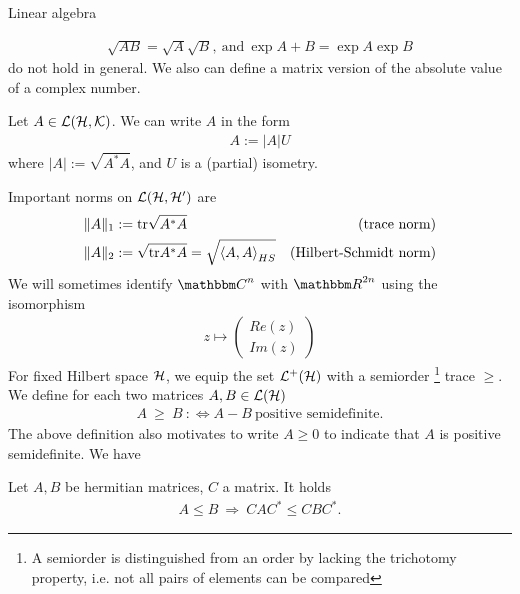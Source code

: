 \begin{section}{Linear algebra}
\begin{remark}
\begin{align}
   \sqrt{AB} = \sqrt{A}\sqrt{B}, \ \text{and} \ \exp{A+B} = \exp{A}\exp{B} 
  \end{align}
  do not hold in general. We also can define a matrix version of the absolute value of a complex number. 
  \begin{theorem} 
  Let $A \in {\mathcal L}({\mathcal H},{\mathcal K})$. We can write $A$ in the form 
  \begin{align}
   A := |A|U 
  \end{align} 
  where $|A| := \sqrt{A^\ast A}$, and $U$ is a (partial) isometry.
 \end{theorem}
 \end{remark}
 Important norms on ${\mathcal L}({\mathcal H}, {\mathcal H}')$ are 
 \begin{align}
  \|A\|_1 &:= \mathrm{tr} \sqrt{A^\ast A} & \text{(trace norm)} \\
  \|A\|_2 &:= \sqrt{\mathrm{tr} A^\ast A} = \sqrt{\braket{A,A}_{HS}} & \text{(Hilbert-Schmidt norm)}
 \end{align}  
 We will sometimes identify $\bbmC^n$ with $\bbmR^{2n}$ using the isomorphism 
 \begin{align}
  z \mapsto \left(\begin{array}{c} Re(z) \\ Im(z) \end{array}\right)
 \end{align}
 For fixed Hilbert space ${\mathcal H}$, we equip the set ${\mathcal L}^+({\mathcal H})$ with a semiorder \footnote{A semiorder is distinguished from an order by lacking the trichotomy property, i.e. not all pairs of elements can be compared} trace $\geq$. We define for each two matrices $A,B \in {\mathcal L}({\mathcal H})$
 \begin{align}
  A \ \geq \ B \ :\Leftrightarrow A-B \ \text{positive semidefinite}.
 \end{align}
 The above definition also motivates to write $A \geq 0$ to indicate that $A$ is positive semidefinite. We have 
 \begin{lemma} \label{lemma:conjugation_rule}
   Let $A,B$ be hermitian matrices, $C$ a matrix. It holds 
   \begin{align*}
    A \leq B \ \Rightarrow \ CAC^\ast \leq CBC^\ast.
   \end{align*}
  \end{lemma}
 \end{section}
 

